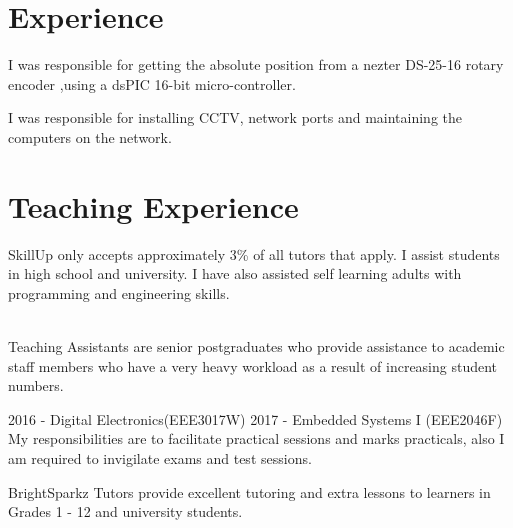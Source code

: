 \documentclass[]{deedy-resume-openfont}
\begin{document}
\hfill
\begin{minipage}[t]{0.66\textwidth} 

\section{Experience}

I was responsible for getting the absolute position from a nezter DS-25-16 rotary encoder ,using a dsPIC 16-bit micro-controller.
\sectionsep

I was responsible for installing CCTV, network ports and maintaining the computers on the network.

\sectionsep

\section{Teaching Experience}

SkillUp only accepts approximately 3\% of all tutors that apply. I assist students in high school and university. I have also assisted self learning adults with programming and engineering skills.
\sectionsep

\\
Teaching Assistants are senior postgraduates who provide assistance to academic staff members who have a very heavy workload as a result of increasing student numbers.
\sectionsep

2016 - Digital Electronics(EEE3017W)
2017 - Embedded Systems I (EEE2046F)
My responsibilities are to facilitate practical sessions and marks practicals, also I am required to invigilate exams and test sessions.
\sectionsep

BrightSparkz Tutors provide excellent tutoring and extra lessons to learners in Grades 1 - 12 and university students. 
\sectionsep


\end{minipage}
\end{document}
